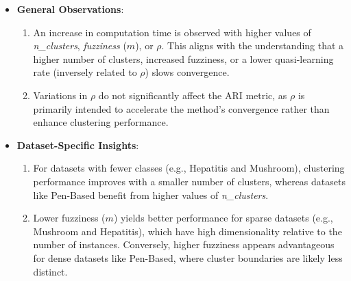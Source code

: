 \begin{itemize} \item \textbf{General Observations}: \begin{enumerate} \item An increase in computation time is observed with higher values of \textit{n\_clusters}, \textit{fuzziness} ($m$), or $\rho$. This aligns with the understanding that a higher number of clusters, increased fuzziness, or a lower quasi-learning rate (inversely related to $\rho$) slows convergence. \item Variations in $\rho$ do not significantly affect the ARI metric, as $\rho$ is primarily intended to accelerate the method's convergence rather than enhance clustering performance. \end{enumerate} \item \textbf{Dataset-Specific Insights}: \begin{enumerate} \item For datasets with fewer classes (e.g., Hepatitis and Mushroom), clustering performance improves with a smaller number of clusters, whereas datasets like Pen-Based benefit from higher values of \textit{n\_clusters}. \item Lower fuzziness ($m$) yields better performance for sparse datasets (e.g., Mushroom and Hepatitis), which have high dimensionality relative to the number of instances. Conversely, higher fuzziness appears advantageous for dense datasets like Pen-Based, where cluster boundaries are likely less distinct. \end{enumerate} \end{itemize}



